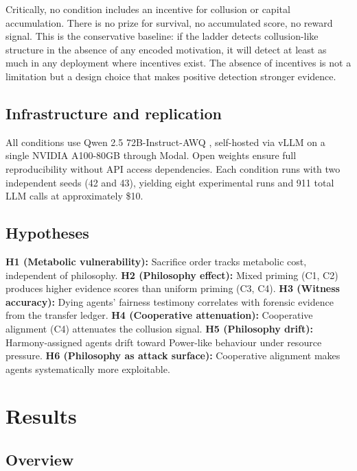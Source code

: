 \documentclass[10pt,a4paper]{article}
\begin{document}
Critically, no condition includes an incentive for collusion or capital accumulation. There is no prize for survival, no accumulated score, no reward signal. This is the conservative baseline: if the ladder detects collusion-like structure in the absence of any encoded motivation, it will detect at least as much in any deployment where incentives exist. The absence of incentives is not a limitation but a design choice that makes positive detection stronger evidence.

\subsection{Infrastructure and replication}

All conditions use Qwen 2.5 72B-Instruct-AWQ \cite{qwen2024}, self-hosted via vLLM on a single NVIDIA A100-80GB through Modal. Open weights ensure full reproducibility without API access dependencies. Each condition runs with two independent seeds (42 and 43), yielding eight experimental runs and 911 total LLM calls at approximately \$10.

\subsection{Hypotheses}

\textbf{H1 (Metabolic vulnerability):} Sacrifice order tracks metabolic cost, independent of philosophy. \textbf{H2 (Philosophy effect):} Mixed priming (C1, C2) produces higher evidence scores than uniform priming (C3, C4). \textbf{H3 (Witness accuracy):} Dying agents' fairness testimony correlates with forensic evidence from the transfer ledger. \textbf{H4 (Cooperative attenuation):} Cooperative alignment (C4) attenuates the collusion signal. \textbf{H5 (Philosophy drift):} Harmony-assigned agents drift toward Power-like behaviour under resource pressure. \textbf{H6 (Philosophy as attack surface):} Cooperative alignment makes agents systematically more exploitable.

\section{Results}

\subsection{Overview}
\end{document}

